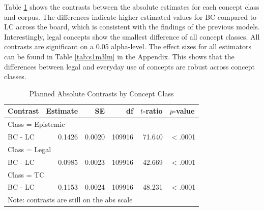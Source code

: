 \documentclass{article}
\begin{document}
Table \ref{tab:s1m3} shows the contrasts between the absolute estimates for each concept class and corpus. The differences indicate higher estimated values for BC compared to LC across the board, which is consistent with the findings of the previous models. Interestingly, legal concepts show the smallest difference of all concept classes. All contrasts are significant on a 0.05 alpha-level. The effect sizes for all estimators can be found in Table \ref{tab:s1m3lm} in the Appendix. This shows that the differences between legal and everyday use of concepts are robust across concept classes.

\begin{table}[ht]
\centering
\begin{tabular}{lrrrrl}
  \hline
Contrast & Estimate & SE & df & $t$-ratio & $p$-value \\ 
  \hline
\multicolumn{6}{l}{Class = Epistemic}\\
BC - LC & 0.1426 & 0.0020 & 109916 & 71.640 & $<$.0001 \\ 
\cmidrule{1-1}
\multicolumn{6}{l}{Class = Legal}\\
BC - LC & 0.0985 & 0.0023 & 109916 & 42.669 & $<$.0001 \\ 
\cmidrule{1-1}
\multicolumn{6}{l}{Class = TC}\\
BC - LC & 0.1153 & 0.0024 & 109916 & 48.231 & $<$.0001 \\ 
   \hline
\multicolumn{6}{l}{{\footnotesize Note: contrasts are still on the abs scale}}\\
\end{tabular}
\caption{Planned Absolute Contrasts by Concept Class}
\label{tab:s1m3}
\end{table}
\end{document}
